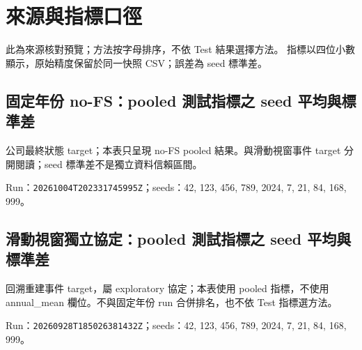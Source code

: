 \section*{來源與指標口徑}
此為來源核對預覽；方法按字母排序，不依 Test 結果選擇方法。
指標以四位小數顯示，原始精度保留於同一快照 CSV；誤差為 seed 標準差。

\subsection*{固定年份 no-FS：pooled 測試指標之 seed 平均與標準差}
公司最終狀態 target；本表只呈現 no-FS pooled 結果。與滑動視窗事件 target 分開閱讀；seed 標準差不是獨立資料信賴區間。
\par Run：\texttt{20261004T202331745995Z}；seeds：42, 123, 456, 789, 2024, 7, 21, 84, 168, 999。\par

\subsection*{滑動視窗獨立協定：pooled 測試指標之 seed 平均與標準差}
回溯重建事件 target，屬 exploratory 協定；本表使用 pooled 指標，不使用 annual\_\allowbreak{}mean 欄位。不與固定年份 run 合併排名，也不依 Test 指標選方法。
\par Run：\texttt{20260928T185026381432Z}；seeds：42, 123, 456, 789, 2024, 7, 21, 84, 168, 999。\par
